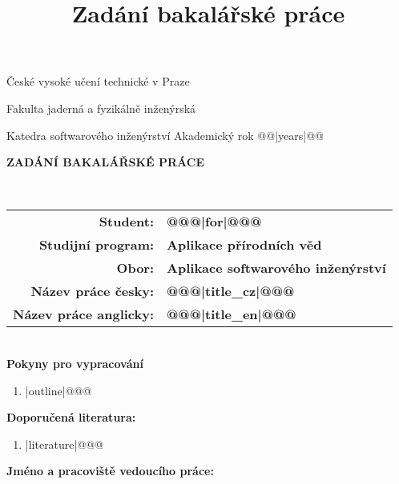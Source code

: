 \documentclass[a4paper,11pt,twoside,final]{article}
\title{Zadání bakalářské práce}
\begin{document}
\begin{titlepage}

\begin{center}
  \begin{huge}
		České vysoké učení technické v Praze\par
		Fakulta jaderná a fyzikálně inženýrská
  \end{huge}
\end{center}

\vspace{5mm}
Katedra softwarového inženýrství \hfill     Akademický rok @@|years|@@\\[2cm]

\begin{center}
  \begin{huge}
    \textbf{ZADÁNÍ BAKALÁŘSKÉ PRÁCE}
  \end{huge}
\\[2cm]
\end{center}


\begin{tabularx}{\textwidth}{rl}
\textbf{Student:} & \textbf{@@@|for|@@@}\\[0.3cm]
\textbf{Studijní program:} & \textbf{Aplikace přírodních věd}\\[0.3cm]
\textbf{Obor:} & \textbf{Aplikace softwarového inženýrství}\\[0.3cm]
\textbf{Název práce česky:} & \textbf{@@@|title_cz|@@@}\\[0.3cm]
\textbf{Název práce anglicky:} & \textbf{@@@|title_en|@@@}
\end{tabularx}
\\[4cm]

\textbf{Pokyny pro vypracování}

\vspace{5pt}
\begin{enumerate}
@@@\item |outline|@@@
\end{enumerate}

\newpage
\pagestyle{empty}

\textbf{Doporučená literatura:}

\leftmargini=13pt
\begin{enumerate}[label=\lbrack\arabic*\rbrack]
@@@\item |literature|@@@
\end{enumerate}

\vfill
\textbf{Jméno a pracoviště vedoucího práce:}


\end{titlepage}
\end{document}
